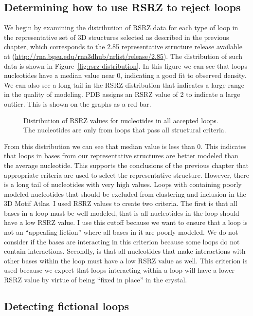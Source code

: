 \subsection{Determining how to use RSRZ to reject loops}

We begin by examining the distribution of RSRZ data for each type of loop in the
representative set of 3D structures selected as described in the previous
chapter, which corresponds to the 2.85 representative structure release
available at (\url{http://rna.bgsu.edu/rna3dhub/nrlist/release/2.85}). The
distribution of such data is shown in Figure~\ref{fig:rsrz-distribution}. In
this figure we can see that loops nucleotides have a median value near 0,
indicating a good fit to observed density. We can also see a long tail in the
RSRZ distribution that indicates a large range in the quality of modeling. PDB
assigns an RSRZ value of 2 to indicate a large outlier. This is shown on the
graphs as a red bar.

\begin{figure}
  \caption{Distribution of RSRZ values for nucleotides in all accepted loops.
    The nucleotides are only from loops that pass all structural criteria.}
  \label{fig:rsrz-distrubution}
\end{figure}

From this distribution we can see that median value is less than 0. This
indicates that loops in bases from our representative structures are better
modeled than the average nucleotide. This supports the conclusions of the
previous chapter that appropriate criteria are used to select the representative
structure. However, there is a long tail of nucleotides with very high values.
Loops with containing poorly modeled nucleotides that should be excluded from
clustering and inclusion in the 3D Motif Atlas. I used RSRZ values to create two
criteria. The first is that all bases in a loop must be well modeled, that is
all nucleotides in the loop should have a low RSRZ value. I use this cutoff
because we want to ensure that a loop is not an ``appealing fiction'' where all
bases in it are poorly modeled. We do not consider if the bases are interacting
in this criterion because some loops do not contain interactions. Secondly, is
that all nucleotides that make interactions with other bases within the loop
must have a low RSRZ value as well. This criterion is used because we expect
that loops interacting within a loop will have a lower RSRZ value by virtue of
being ``fixed in place'' in the crystal.

\subsection{Detecting fictional loops}

